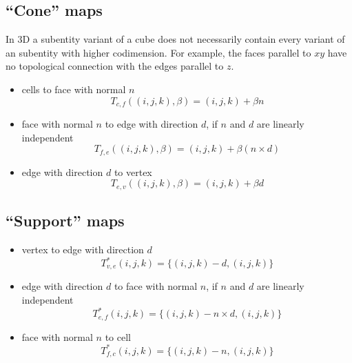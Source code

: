 \documentclass[a4paper,11pt]{article}
\begin{document}
\subsection{``Cone'' maps}
\label{sec:cone-maps}

In 3D a subentity variant of a cube does not necessarily contain every variant
of an subentity with higher codimension. For example, the faces parallel to $xy$
have no topological connection with the edges parallel to $z$.
\begin{itemize}
\item cells to face with normal $n$
  \begin{equation}
    \label{eq:block-cell-face}
    T_{c,f}((i,j,k), \beta) = (i, j, k) + \beta n
  \end{equation}
\item face with normal $n$ to edge with direction $d$, if $n$ and $d$ are
  linearly independent
  \begin{equation}
    \label{eq:block-face-edge}
    T_{f,e} ((i,j,k), \beta) = (i, j, k) + \beta (n\times d)
  \end{equation}
\item edge with direction $d$ to vertex
  \begin{equation}
    \label{eq:block-edge-vertex}
    T_{e,v} ((i,j,k), \beta) = (i, j, k) + \beta d
  \end{equation}
\end{itemize}

\subsection{``Support'' maps}
\label{sec:support-maps}
\begin{itemize}
\item vertex to edge with direction $d$
  \begin{equation}
    \label{eq:block-vertex-edge}
    T^*_{v,e} (i,j,k) = \{(i,j,k) - d, (i,j,k)\}
  \end{equation}
\item edge with direction $d$ to face with normal $n$, if $n$ and $d$ are
  linearly independent
  \begin{equation}
    \label{eq:block-edge-face}
    T^*_{e,f} (i,j,k) = \{(i,j,k) - n\times d, (i,j,k)\}
  \end{equation}
\item face with normal $n$ to cell
    \begin{equation}
    \label{eq:block-face-cell}
    T^*_{f,c} (i,j,k) = \{(i,j,k) - n, (i,j,k)\}
  \end{equation}
\end{itemize}
\end{document}
